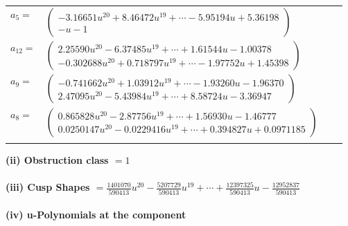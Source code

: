 \documentclass[1p]{elsarticle_modified}
\theoremstyle{definition}
\begin{document}
\begin{tabular}{m{7pt} m{180pt} m{7pt} m{180pt} }
\flushright $a_{5}=$&$\begin{pmatrix}-3.16651 u^{20}+8.46472 u^{19}+\cdots-5.95194 u+5.36198\\- u-1\end{pmatrix}$ \\
\flushright $a_{12}=$&$\begin{pmatrix}2.25590 u^{20}-6.37485 u^{19}+\cdots+1.61544 u-1.00378\\-0.302688 u^{20}+0.718797 u^{19}+\cdots-1.97752 u+1.45398\end{pmatrix}$ \\
\flushright $a_{9}=$&$\begin{pmatrix}-0.741662 u^{20}+1.03912 u^{19}+\cdots-1.93260 u-1.96370\\2.47095 u^{20}-5.43984 u^{19}+\cdots+8.58724 u-3.36947\end{pmatrix}$ \\
\flushright $a_{8}=$&$\begin{pmatrix}0.865828 u^{20}-2.87756 u^{19}+\cdots+1.56930 u-1.46777\\0.0250147 u^{20}-0.0229416 u^{19}+\cdots+0.394827 u+0.0971185\end{pmatrix}$\\&\end{tabular}
\flushleft \textbf{(ii) Obstruction class $= 1$}\\~\\
\flushleft \textbf{(iii) Cusp Shapes $= \frac{1401070}{590413} u^{20}-\frac{5207729}{590413} u^{19}+\cdots+\frac{12397325}{590413} u-\frac{12952837}{590413}$}\\~\\
\newpage\renewcommand{\arraystretch}{1}
\flushleft \textbf{(iv) u-Polynomials at the component}\newline \\
\end{document}
